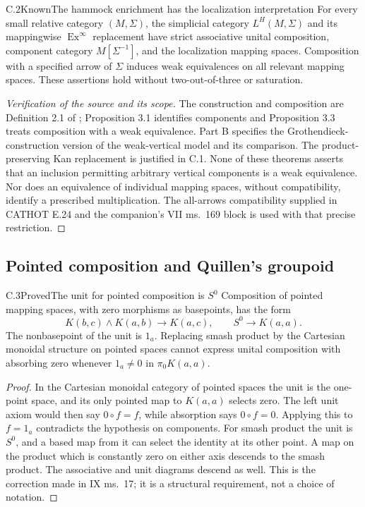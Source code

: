 \begin{result}{C.2}{Known}{The hammock enrichment has the localization interpretation}
For every small relative category $(M,\Sigma)$, the simplicial category $L^H(M,\Sigma)$ and its mappingwise $\operatorname{Ex}^{\infty}$ replacement have strict associative unital composition, component category $M[\Sigma^{-1}]$, and the localization mapping spaces. Composition with a specified arrow of $\Sigma$ induces weak equivalences on all relevant mapping spaces. These assertions hold without two-out-of-three or saturation.
\end{result}
\begin{proof}[Verification of the source and its scope]
The construction and composition are Definition 2.1 of \citet{DwyerKan1980Calculating}; Proposition 3.1 identifies components and Proposition 3.3 treats composition with a weak equivalence. Part B specifies the Grothendieck-construction version of the weak-vertical model and its comparison. The product-preserving Kan replacement is justified in C.1. None of these theorems asserts that an inclusion permitting arbitrary vertical components is a weak equivalence. Nor does an equivalence of individual mapping spaces, without compatibility, identify a prescribed multiplication. The all-arrows compatibility supplied in CATHOT E.24 and the companion's VII ms.~169 block is used with that precise restriction.
\end{proof}

\subsection{Pointed composition and Quillen's groupoid}

\begin{result}{C.3}{Proved}{The unit for pointed composition is $S^0$}
Composition of pointed mapping spaces, with zero morphisms as basepoints, has the form
\[
 K(b,c)\wedge K(a,b)\longrightarrow K(a,c),\qquad
 S^0\longrightarrow K(a,a).
\]
The nonbasepoint of the unit is $1_a$. Replacing smash product by the Cartesian monoidal structure on pointed spaces cannot express unital composition with absorbing zero whenever $1_a\ne0$ in $\pi_0K(a,a)$.
\end{result}
\begin{proof}
In the Cartesian monoidal category of pointed spaces the unit is the one-point space, and its only pointed map to $K(a,a)$ selects zero. The left unit axiom would then say $0\circ f=f$, while absorption says $0\circ f=0$. Applying this to $f=1_a$ contradicts the hypothesis on components. For smash product the unit is $S^0$, and a based map from it can select the identity at its other point. A map on the product which is constantly zero on either axis descends to the smash product. The associative and unit diagrams descend as well. This is the correction made in IX ms.~17; it is a structural requirement, not a choice of notation.
\end{proof}

